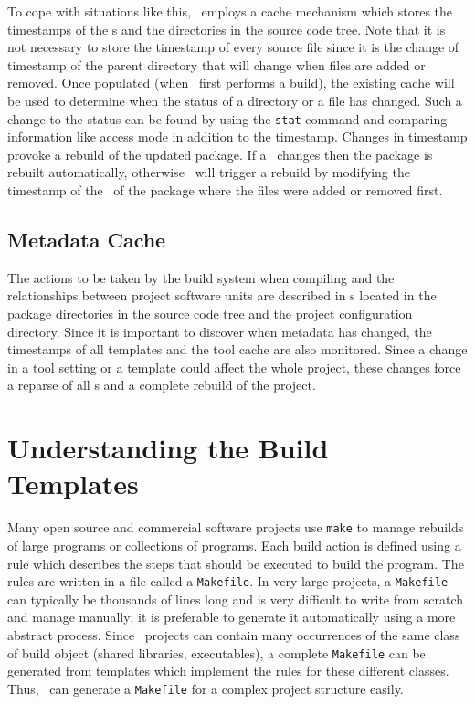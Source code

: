 \ni To cope with situations like this, \scram\ employs a cache mechanism
which stores the timestamps of the \buildfile s and the directories in
the source code tree. Note that it is not necessary to store the
timestamp of every source file since it is the change of timestamp of
the parent directory that will change when files are added or removed.
Once populated (when \scram\ first performs a build), the existing
cache will be used to determine when the status of a directory or a
file has changed. Such a change to the status can be found by using
the \texttt{stat} command and comparing information like access mode
in addition to the timestamp. Changes in timestamp provoke a rebuild
of the updated package. If a \buildfile\ changes then the package is
rebuilt automatically, otherwise \scram\ will trigger a rebuild by
modifying the timestamp of the \buildfile\ of the package where the
files were added or removed first.

\subsection{Metadata Cache}
\label{sec:bsmdcache}

The actions to be taken by the build system when compiling and the
relationships between project software units are described in
\buildfile s located in the package directories in the source
code tree and the project configuration directory. Since it is
important to discover when metadata has changed, the timestamps of all
templates and the tool cache are also monitored. Since a change in a
tool setting or a template could affect the whole project, these
changes force a reparse of all \buildfile s and a complete rebuild of
the project.

\section{Understanding the Build Templates}
\label{sec:bstemplates}

Many open source and commercial software projects use \texttt{make} to manage rebuilds
of large programs or collections of programs. Each build action is
defined using a rule which describes the steps that should be executed
to build the program. The rules are written in a file called a 
\texttt{Makefile}. In very large projects, a \texttt{Makefile} can typically be
thousands of lines long and is very difficult to write
from scratch and manage manually; it is preferable to generate it
automatically using a more abstract process. Since \scram\ projects can
contain many occurrences of the same class of build object (\eg shared
libraries, executables), a complete \texttt{Makefile} can be
generated from templates which implement the rules for these different classes.
Thus, \scram\ can generate a \texttt{Makefile} for a complex project structure easily.

